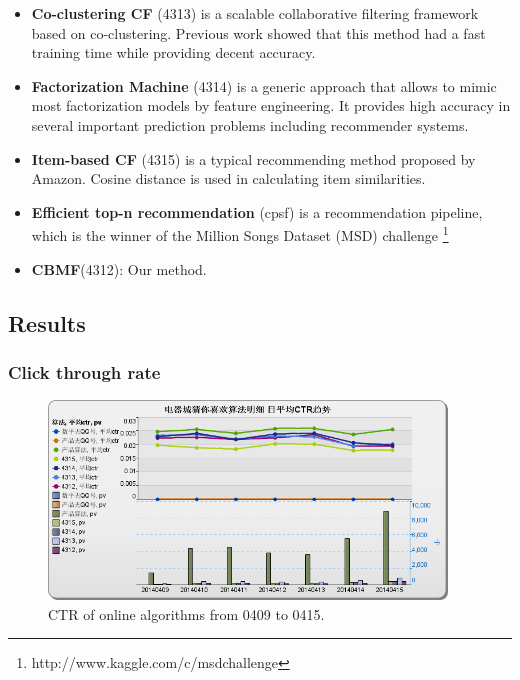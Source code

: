 \begin{itemize}

\item \textbf{Co-clustering CF} \cite{1565742}(4313) is a scalable collaborative filtering framework based on co-clustering. Previous work showed that this method had a fast training time while providing decent accuracy.
\item \textbf{Factorization Machine} \cite{/tist/LibFM-TIST12}(4314) is a generic approach that allows to mimic most factorization models by feature engineering. It provides high accuracy in several important prediction problems including recommender systems.
\item \textbf{Item-based CF} \cite{1167344}(4315) is a typical recommending method proposed by Amazon. Cosine distance is used in calculating item similarities.
\item \textbf{Efficient top-n recommendation} \cite{Aiolli:2013:ETR:2507157.2507189}(cpsf) is a recommendation pipeline, which is the winner of the Million Songs Dataset (MSD) challenge \footnote{http://www.kaggle.com/c/msdchallenge}
\item \textbf{CBMF}(4312): Our method.

\end{itemize} 

\subsection{Results}

\subsubsection{Click through rate}


\begin{figure}
\begin{center}
\includegraphics[width=400px]{fig/yixunexp/ctr0415.png}
\caption{\label{fig:ctr0415} CTR of online algorithms from 0409 to 0415.}

\end{center}
\end{figure}

